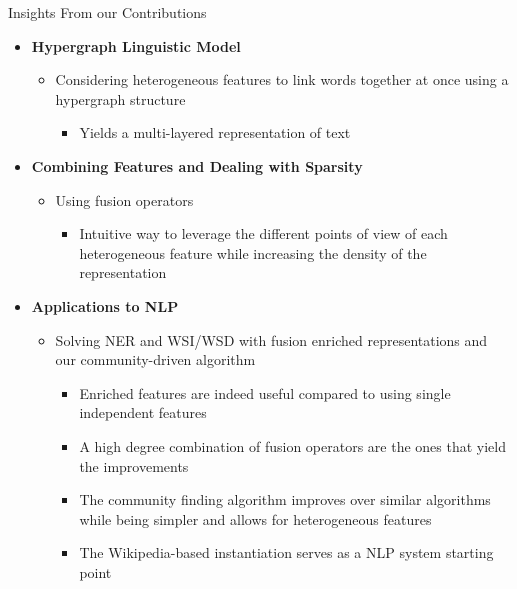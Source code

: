 \documentclass[10pt,xcolor=table]{beamer}
\begin{document}
\begin{frame}{Insights From our Contributions}
\begin{itemize}[<+- | alert@+>]
\item \textbf{Hypergraph Linguistic Model}
	\begin{itemize}
	\item Considering heterogeneous features to link words together at once using a hypergraph structure
		\begin{itemize}	
		\item Yields a multi-layered representation of text
		\end{itemize}
	\end{itemize}
\item \textbf{Combining Features and Dealing with Sparsity}
	\begin{itemize}
	\item Using fusion operators
		\begin{itemize}	
			\item Intuitive way to leverage the different points of view of each heterogeneous feature while increasing the density of the representation
		\end{itemize}

	\end{itemize}
\item \textbf{Applications to NLP}
	\begin{itemize}
	\item Solving NER and WSI/WSD with fusion enriched representations and our community-driven algorithm
		\begin{itemize}	
		\item Enriched features are indeed useful compared to using single independent features
		\item A high degree combination of fusion operators are the ones that yield the improvements
		\item The community finding algorithm improves over similar algorithms while being simpler and allows for heterogeneous features
		\item The Wikipedia-based instantiation serves as a NLP system starting point

		\end{itemize}
	
	\end{itemize}
\end{itemize}


\end{frame}
\end{document}
